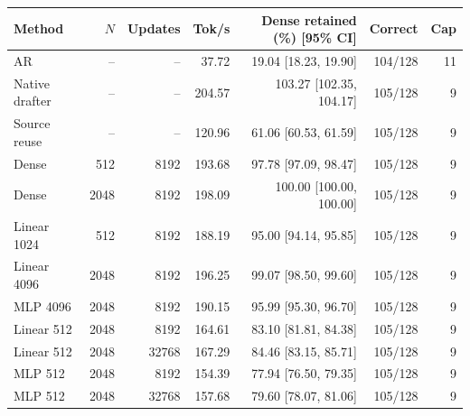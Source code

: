 \begin{tabular}{lrrrrrr}
\toprule
Method & $N$ & Updates & Tok/s & Dense retained (\%) [95\% CI] & Correct & Cap \\
\midrule
AR & -- & -- & 37.72 & 19.04 [18.23, 19.90] & 104/128 & 11 \\
Native drafter & -- & -- & 204.57 & 103.27 [102.35, 104.17] & 105/128 & 9 \\
Source reuse & -- & -- & 120.96 & 61.06 [60.53, 61.59] & 105/128 & 9 \\
\midrule
Dense & 512 & 8192 & 193.68 & 97.78 [97.09, 98.47] & 105/128 & 9 \\
Dense & 2048 & 8192 & 198.09 & 100.00 [100.00, 100.00] & 105/128 & 9 \\
Linear 1024 & 512 & 8192 & 188.19 & 95.00 [94.14, 95.85] & 105/128 & 9 \\
Linear 4096 & 2048 & 8192 & 196.25 & 99.07 [98.50, 99.60] & 105/128 & 9 \\
MLP 4096 & 2048 & 8192 & 190.15 & 95.99 [95.30, 96.70] & 105/128 & 9 \\
Linear 512 & 2048 & 8192 & 164.61 & 83.10 [81.81, 84.38] & 105/128 & 9 \\
Linear 512 & 2048 & 32768 & 167.29 & 84.46 [83.15, 85.71] & 105/128 & 9 \\
MLP 512 & 2048 & 8192 & 154.39 & 77.94 [76.50, 79.35] & 105/128 & 9 \\
MLP 512 & 2048 & 32768 & 157.68 & 79.60 [78.07, 81.06] & 105/128 & 9 \\
\bottomrule
\end{tabular}
